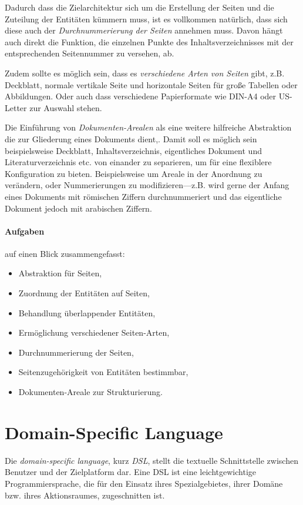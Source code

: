 Dadurch dass die Zielarchitektur sich um die Erstellung der Seiten und
die Zuteilung der Entitäten kümmern muss, ist es vollkommen natürlich,
dass sich diese auch der \emph{Durchnummerierung der Seiten} annehmen muss.
Davon hängt auch direkt die Funktion, die einzelnen Punkte des
Inhaltsverzeichnisses mit der entsprechenden Seitennummer zu versehen, ab.

Zudem sollte es möglich sein, dass es \emph{verschiedene Arten von Seiten}
gibt, z.B. Deckblatt, normale vertikale Seite und horizontale Seiten für
große Tabellen oder Abbildungen. Oder auch dass verschiedene Papierformate
wie DIN-A4 oder US-Letter zur Auswahl stehen.

Die Einführung von \emph{Dokumenten-Arealen} als eine weitere hilfreiche
Abstraktion die zur Gliederung eines Dokuments dient,.
Damit soll es möglich sein beispielsweise
Deckblatt, Inhaltsverzeichnis, eigentliches Dokument
und Literaturverzeichnis etc. von einander zu separieren, um für eine
flexiblere Konfiguration zu bieten. Beispielsweise um Areale in der Anordnung zu
verändern, oder Nummerierungen zu modifizieren---z.B. wird
gerne der Anfang eines Dokuments mit römischen Ziffern durchnummeriert
und das eigentliche Dokument jedoch mit arabischen Ziffern.

\paragraph{Aufgaben} auf einen Blick zusammengefasst:

\begin{itemize}
  \item Abstraktion für Seiten,
  \item Zuordnung der Entitäten auf Seiten,
  \item Behandlung überlappender Entitäten,
  \item Ermöglichung verschiedener Seiten-Arten,
  \item Durchnummerierung der Seiten,
  \item Seitenzugehörigkeit von Entitäten bestimmbar,
  \item Dokumenten-Areale zur Strukturierung.
\end{itemize}


\section{Domain-Specific Language}\label{sec-dsl}

Die \emph{domain-specific language}, kurz \emph{DSL}, stellt die
textuelle Schnittstelle zwischen Benutzer und der Zielplatform dar.
Eine DSL ist eine leichtgewichtige Programmiersprache, die für den
Einsatz ihres Spezialgebietes, ihrer Domäne bzw. ihres Aktionsraumes,
zugeschnitten ist.

